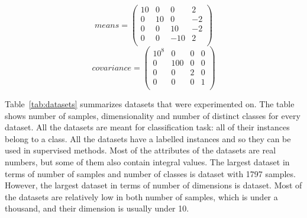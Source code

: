 \documentclass[12pt,a4paper]{report}
\begin{document}
\begin{equation} \label{eq:gauss:means}
means = \begin{pmatrix}
10 & 0 & 0 & 2 \\
0 & 10 & 0 & -2 \\
0 & 0 & 10 & -2 \\
0 & 0 & -10 & 2 \\
\end{pmatrix}
\end{equation}
\begin{equation} \label{eq:gauss:cov}
covariance = \begin{pmatrix}
10^8 & 0 & 0 & 0 \\
0 & 100 & 0 & 0 \\
0 & 0 & 2 & 0 \\
0 & 0 & 0 & 1 \\
\end{pmatrix}
\end{equation}

Table~\ref{tab:datasets} summarizes datasets that were experimented on. The table shows number of samples, dimensionality and number of distinct classes for every dataset. All the datasets are meant for classification task: all of their instances belong to a class. All the datasets have a labelled instances and so they can be used in supervised methods. Most of the attributes of the datasets are real numbers, but some of them also contain integral values. The largest dataset in terms of number of samples and number of classes is  dataset with 1797 samples. However, the largest dataset in terms of number of dimensions is  dataset. Most of the datasets are relatively low in both number of samples, which is under a thousand, and their dimension is usually under 10.
\end{document}
